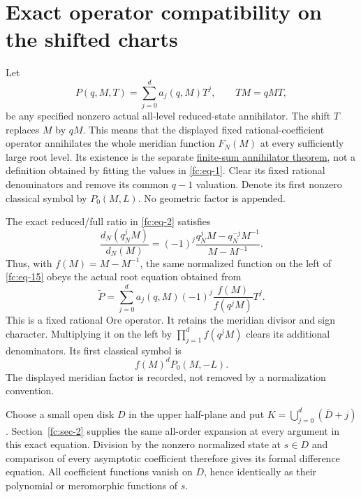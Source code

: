 \section{Exact operator compatibility on the shifted charts}\label{fc:sec-5}

Let
\begin{equation}\label{fc:eq-17}
P(q,M,T)=\sum_{j=0}^{d}a_j(q,M)T^j,\qquad TM=qMT,
\end{equation}
 be any specified nonzero actual all-level reduced-state annihilator. The shift \(T\) replaces \(M\) by \(qM\). This means that the displayed fixed rational-coefficient operator annihilates the whole meridian function \(F_N(M)\) at every sufficiently large root level. Its existence is the separate \href{https://sashakolpakov.github.io/murakamis_dream/notes/finite_sum_annihilator.html}{finite-sum annihilator theorem}, not a definition obtained by fitting the values in \eqref{fc:eq-1}. Clear its fixed rational denominators and remove its common \(q-1\) valuation. Denote its first nonzero classical symbol by \(P_0(M,L)\). No geometric factor is appended.

The exact reduced/full ratio in \eqref{fc:eq-2} satisfies
\begin{equation}\label{fc:eq-18}
\frac{d_N(q_N^jM)}{d_N(M)}
    =(-1)^j\frac{q_N^jM-q_N^{-j}M^{-1}}{M-M^{-1}}.
\end{equation}
 Thus, with \(f(M)=M-M^{-1}\), the same normalized function on the left of \eqref{fc:eq-15} obeys the actual root equation obtained from
\begin{equation}\label{fc:eq-19}
\widetilde P
  =\sum_{j=0}^{d}a_j(q,M)(-1)^j
                      \frac{f(M)}{f(q^jM)}T^j.
\end{equation}
 This is a fixed rational Ore operator. It retains the meridian divisor and sign character. Multiplying it on the left by \(\prod_{j=1}^{d}f(q^jM)\) clears its additional denominators. Its first classical symbol is
\begin{equation}\label{fc:eq-20}
f(M)^d P_0(M,-L).
\end{equation}
 The displayed meridian factor is recorded, not removed by a normalization convention.

Choose a small open disk \(D\) in the upper half-plane and put \(K=\bigcup_{j=0}^{d}(\overline D+j)\). Section~\ref{fc:sec-2} supplies the same all-order expansion at every argument in this exact equation. Division by the nonzero normalized state at \(s\in D\) and comparison of every asymptotic coefficient therefore gives its formal difference equation. All coefficient functions vanish on \(D\), hence identically as their polynomial or meromorphic functions of \(s\).


